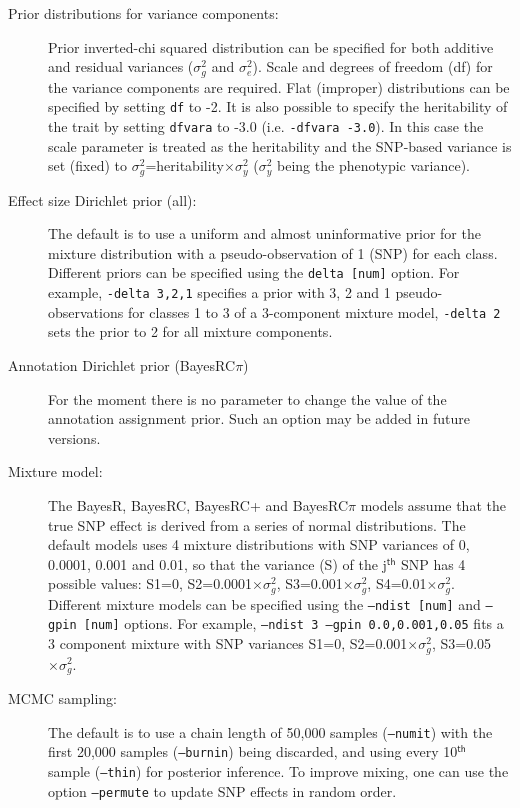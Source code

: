 \documentclass{ol-softwaremanual}
\begin{document}
\begin{description}
\item[Prior distributions for variance components:] Prior inverted-chi squared distribution can be specified for both additive and residual variances ($\sigma_g^2$ and $\sigma_e^2$). Scale and degrees of freedom (df) for the variance components are required. Flat (improper) distributions can be specified by setting \texttt{df} to -2. It is also possible to specify the heritability of the trait by setting \texttt{dfvara} to -3.0 (i.e. \texttt{-dfvara -3.0}). In this case the scale parameter is treated as the heritability and the SNP-based variance is set (fixed) to $\sigma_g^2$=heritability$\times \sigma_y^2$ ($\sigma_y^2$ being the phenotypic variance).
\item[Effect size Dirichlet prior (all):] The default is to use a uniform and almost uninformative prior for the mixture distribution with a pseudo-observation of 1 (SNP) for each class. Different priors can be specified using the \texttt{delta [num]} option. For example, \texttt{-delta 3,2,1} specifies a prior with 3, 2 and 1 pseudo-observations for classes 1 to 3 of a 3-component mixture model, \texttt{-delta 2} sets the prior to 2 for all mixture components.
\item[Annotation Dirichlet prior (BayesRC$\pi$)] For the moment there is no parameter to change the value of the annotation assignment prior. Such an option may be added in future versions.
\item[Mixture model:] The BayesR, BayesRC, BayesRC+ and BayesRC$\pi$ models assume that the true SNP effect is derived from a series of normal distributions. The default models uses 4 mixture distributions with SNP variances of 0, 0.0001, 0.001 and 0.01, so that the variance (S) of the j$^{\mathsf{th}}$ SNP has 4 possible values:  S1=0, S2=0.0001$\times \sigma_g^2$, S3=0.001$\times \sigma_g^2$, S4=0.01$\times \sigma_g^2$. Different mixture models can be specified using 
the \texttt{–ndist [num]} and \texttt{–gpin [num]} options. For example, \texttt{–ndist 3 –gpin 0.0,0.001,0.05} fits a 3 component mixture with SNP variances S1=0, S2=0.001$\times \sigma_g^2$, S3=0.05$\times \sigma_g^2$. 
\item[MCMC sampling:] The default is to use a chain length of 50,000 samples (\texttt{–numit}) with the first 20,000 samples (\texttt{–burnin}) being discarded, and using every 10$^{\mathsf{th}}$ sample (\texttt{–thin}) for posterior inference. To improve mixing, one can use the option \texttt{–permute} to update SNP effects in random order. 
\end{description}
\end{document}

